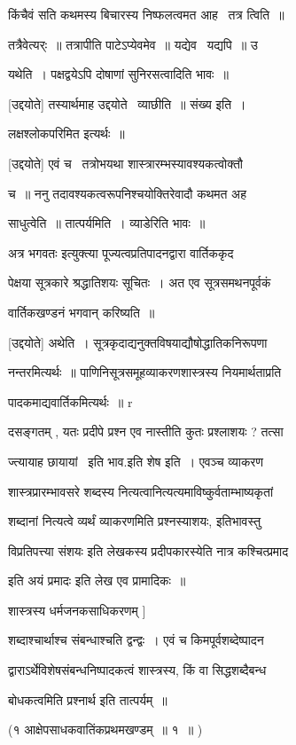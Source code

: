 \documentclass[11pt, openany]{book}
\begin{document}
किंचैवं सति कथमस्य बिचारस्य निष्फलत्वमत आह \textendash\ तत्र त्विति~॥ 

तत्रैवेत्यर्ः~॥ तत्रापीति पाटेऽप्येवमेव~॥ यद्येव \textendash\ यद्यपि~॥ उ \textendash\ 

यथेति~। पक्षद्वयेऽपि दोषाणां सुनिरसत्वादिति भावः~॥ 

[उद्दयोते] तस्यार्थमाह उद्दयोते \textendash\ व्याछीति~॥ संख्य इति~। 

लक्षश्लोकपरिमित इत्यर्थः~॥ 

[उद्दयोते] एवं च \textendash\ तत्रोभयथा शास्त्रारम्भस्यावश्यकत्वोक्तौ 

च~॥ ननु तदावश्यकत्वरूपनिश्चयोक्तिरेवादौ कथमत अह \textendash\ 

साधुत्वेति~॥ तात्पर्यमिति~। व्याडेरिति भावः~॥ 

{\qt अत्र भगवतः} इत्युक्त्या पूज्यत्वप्रतिपादनद्वारा वार्तिककृद \textendash\ 

पेक्षया सूत्रकारे श्रद्धातिशयः सूचितः~। अत एव सूत्रसमथनपूर्वकं 

वार्तिकखण्डनं भगवान् करिष्यति~॥ 

[उद्दयोते] अथेति~। सूत्रकृदाद्यनुक्तविषयाद्यौषोद्धातिकनिरूपणा \textendash\ 

नन्तरमित्यर्थः~॥ पाणिनिसूत्रसमूहव्याकरणशास्त्रस्य नियमार्थताप्रति \textendash\ 

पादकमाद्यवार्तिकमित्यर्थः~॥ r 

दसङ्गतम् , यतः प्रदीपे प्रश्न एव नास्तीति कुतः प्रश्लाशयः ? तत्सा \textendash\ 

ज्त्यायाह छायायां \textendash\ इति भाव.इति शेष इति~। एवञ्च व्याकरण \textendash\ 

शास्त्रप्रारम्भावसरे शब्दस्य नित्यत्वानित्यत्यमाविष्कुर्वताम्भाष्यकृतां


शब्दानां नित्यत्वे व्यर्थं व्याकरणमिति प्रश्नस्याशयः, इतिभावस्तु 

{\qt विप्रतिपत्त्या संशयः} इति लेखकस्य प्रदीपकारस्येति नात्र कश्चित्प्रमाद


इति {\qt अयं प्रमादः} इति लेख एव प्रामादिकः~॥ 

शास्त्रस्य धर्मजनकसाधिकरणम् ] 



शब्दाश्चार्थाश्च संबन्धाश्चति द्वन्द्वः~। एवं च किमपूर्वशब्देष्पादन \textendash\ 

द्वाराऽर्थेविशेषसंबन्धनिष्पादकत्वं शास्त्रस्य, किं वा सिद्धशब्दैबन्ध \textendash\ 

बोधकत्वमिति प्रश्नार्थ इति तात्पर्यम्~॥ 

(१ आक्षेपसाधकवातिंकप्रथमखण्डम्~॥ १~॥ ) 
\end{document}
